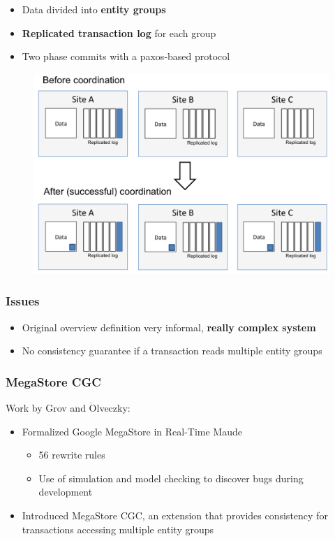 \documentclass{beamer}
\begin{document}
\begin{frame}
    \begin{itemize}
        \item Data divided into \textbf{entity groups} 
        \item \textbf{Replicated transaction log}  for each group
        \item Two phase commits with a paxos-based protocol 
    \end{itemize}
    \begin{figure}
        \includegraphics[scale=0.2]{img/paxos.png}
    \end{figure}
\end{frame}
\begin{frame}
    \frametitle{Issues}
    \begin{itemize}
        \item Original overview definition very informal, \textbf{really complex system}
        \item No consistency guarantee if a transaction reads multiple entity groups
    \end{itemize}
\end{frame}
\begin{frame}
    \frametitle{MegaStore CGC}

    Work by  Grov and $\ddot{\text{O}}$lveczky:
    \begin{itemize}
        \item Formalized Google MegaStore in Real-Time Maude
        \begin{itemize}
            \item 56 rewrite rules 
            \item Use  of simulation and model checking to discover bugs during development
        \end{itemize} 
        \item Introduced MegaStore CGC, an extension that provides consistency for transactions 
        accessing multiple entity groups 
    \end{itemize} 
    
\end{frame}
\end{document}
